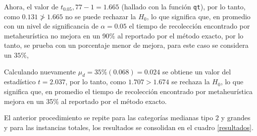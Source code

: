 \documentclass[preprint,12pt, pdftex]{elsarticle}
\begin{document}
Ahora, el valor de $t_{0.05}, 77-1 = 1.665$ (hallado con la función \texttt{qt}), por lo tanto, como $0.131 \not> 1.665$ no se puede rechazar la $H_{0}$, lo que significa que, en promedio con un nivel de significancia de $\alpha = 0.05$ el tiempo de recolección encontrado por metaheurística no mejora en un 90\% al reportado por el método exacto, por lo tanto, se prueba con un porcentaje menor de mejora, para este caso se considera un $35\%$, 

Calculando nuevamente $\mu_{d} = 35\%(0.068) =  0.024$ se obtiene un valor del estadístico $t= 2.037$, por lo tanto, como $1.707 > 1.674$ se rechaza la $H_{0}$, lo que significa que, en promedio el tiempo de recolección encontrado por metaheurística mejora en un 35\% al reportado por el método exacto.


El anterior procedimiento se repite para las categorías medianas tipo $2$ y grandes y para las instancias totales, los resultados se consolidan en el cuadro \ref{resultados}.
\end{document}
